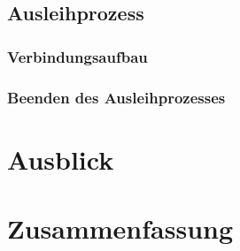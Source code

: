 \documentclass[doktyp=barbeit]{TUBAFarbeiten}
\begin{document}
	\subsection{Ausleihprozess}

		\subsubsection{Verbindungsaufbau}

		\subsubsection{Beenden des Ausleihprozesses}

\newpage
\section{Ausblick}

\newpage
\section{Zusammenfassung}

\newpage
\printbibliography[heading=bibintoc]
\end{document}
